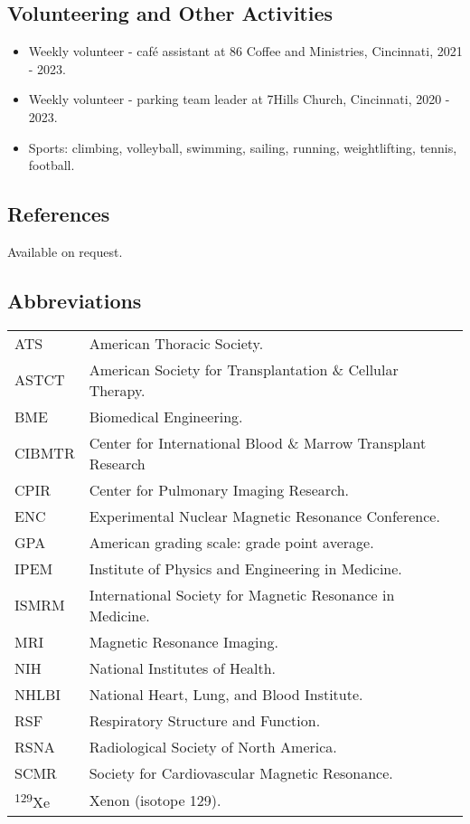 \documentclass[12pt,]{scrartcl}
\begin{document}
\subsection{Volunteering and Other Activities}\label{volunteering-other-activities}

\begin{itemize}
  \leftskip-0.25in
  \item Weekly volunteer - caf\'{e} assistant at 86 Coffee and Ministries, Cincinnati, 2021 - 2023.
  \item Weekly volunteer - parking team leader at 7Hills Church, Cincinnati, 2020 - 2023.
  \item Sports: climbing, volleyball, swimming, sailing, running, weightlifting, tennis, football.
\end{itemize}

%

\subsection{References}\label{references}

Available on request.

\newpage

\subsection{Abbreviations}\label{abbreviations}
\begin{table}[h!]
{\def\arraystretch{1.5}\tabcolsep=0pt
\begin{tabular}{p{0.15\linewidth}p{0.85\linewidth}}
    ATS & American Thoracic Society. \\
    ASTCT & American Society for Transplantation \& Cellular Therapy. \\
    BME & Biomedical Engineering. \\
    CIBMTR & Center for International Blood \& Marrow Transplant Research \\
    CPIR & Center for Pulmonary Imaging Research. \\
    ENC & Experimental Nuclear Magnetic Resonance Conference. \\
    GPA & American grading scale: grade point average. \\
    IPEM & Institute of Physics and Engineering in Medicine. \\
    ISMRM & International Society for Magnetic Resonance in Medicine. \\
    MRI & Magnetic Resonance Imaging. \\
    NIH & National Institutes of Health. \\
    NHLBI & National Heart, Lung, and Blood Institute. \\
    RSF & Respiratory Structure and Function. \\
    RSNA & Radiological Society of North America. \\
    SCMR & Society for Cardiovascular Magnetic Resonance. \\
    \textsuperscript{129}Xe & Xenon (isotope 129). \\
\end{tabular}%
}
\end{table}
\end{document}
